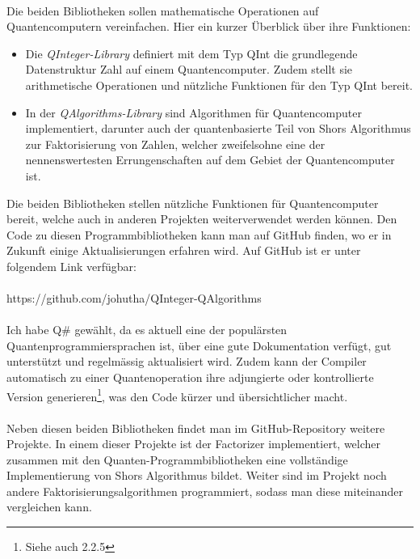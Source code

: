 \paragraph{}
Die beiden Bibliotheken sollen mathematische Operationen auf Quantencomputern vereinfachen. Hier ein kurzer Überblick über ihre Funktionen: %
\begin{itemize}
  \item Die \textit{QInteger-Library} definiert mit dem Typ \grqq QInt\grqq{} die grundlegende Datenstruktur \grqq Zahl\grqq{} auf einem Quantencomputer. Zudem stellt sie arithmetische Operationen und nützliche Funktionen für den Typ \grqq QInt\grqq{} bereit. %
  \item In der \textit{QAlgorithms-Library} sind Algorithmen für Quantencomputer implementiert, darunter auch der quantenbasierte Teil von Shors Algorithmus zur Faktorisierung von Zahlen, welcher zweifelsohne eine der nennenswertesten Errungenschaften auf dem Gebiet der Quantencomputer ist.
\end{itemize}
Die beiden Bibliotheken stellen nützliche Funktionen für Quantencomputer bereit, welche auch in anderen Projekten weiterverwendet werden können. Den Code zu diesen Programmbibliotheken kann man auf GitHub finden, wo er in Zukunft einige Aktualisierungen erfahren wird. Auf GitHub ist er unter folgendem Link verfügbar:
\paragraph{}
\centerline{ https://github.com/johutha/QInteger-QAlgorithms }
\paragraph{}
Ich habe Q\# gewählt, da es aktuell eine der populärsten Quantenprogrammiersprachen ist, über eine gute Dokumentation verfügt, gut unterstützt und regelmässig aktualisiert wird. Zudem kann der Compiler automatisch zu einer Quantenoperation ihre adjungierte oder kontrollierte Version generieren\footnote{Siehe auch 2.2.5}, was den Code kürzer und übersichtlicher macht.

\paragraph{}

Neben diesen beiden Bibliotheken findet man im GitHub-Repository weitere Projekte. In einem dieser Projekte ist der \grqq Factorizer\grqq{} implementiert, welcher zusammen mit den Quanten-Programmbibliotheken eine vollständige Implementierung von Shors Algorithmus bildet. Weiter sind im Projekt noch andere Faktorisierungsalgorithmen programmiert, sodass man diese miteinander vergleichen kann.

